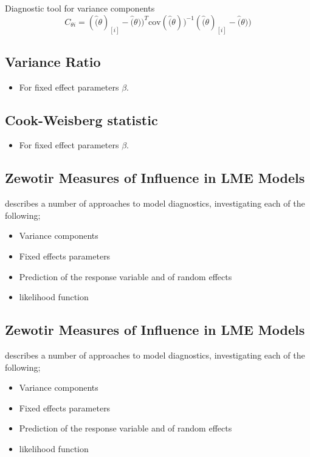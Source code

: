 \documentclass[Main.tex]{subfiles}
\begin{document}
	Diagnostic tool for variance components
	\[ C_{\theta i} =(\hat(\theta)_{[i]} - \hat(\theta))^{T}\mbox{cov}( \hat(\theta))^{-1}(\hat(\theta)_{[i]} - \hat(\theta))\]
	
\subsection{Variance Ratio} %
\begin{itemize}
	\item For fixed effect parameters $\beta$.
\end{itemize}

	
	\subsection{Cook-Weisberg statistic} %
	\begin{itemize}
		\item For fixed effect parameters $\beta$.
	\end{itemize}
	\subsection{Zewotir Measures of Influence in LME Models}%
	\citet{Zewotir} describes a number of approaches to model diagnostics, investigating each of the following;
	\begin{itemize}
		\item Variance components
		\item Fixed effects parameters
		\item Prediction of the response variable and of random effects
		\item likelihood function
	\end{itemize}
	
\subsection{Zewotir Measures of Influence in LME Models}%
\citet{Zewotir} describes a number of approaches to model diagnostics, investigating each of the following;
\begin{itemize}
	\item Variance components
	\item Fixed effects parameters
	\item Prediction of the response variable and of random effects
	\item likelihood function
\end{itemize}
\end{document}
